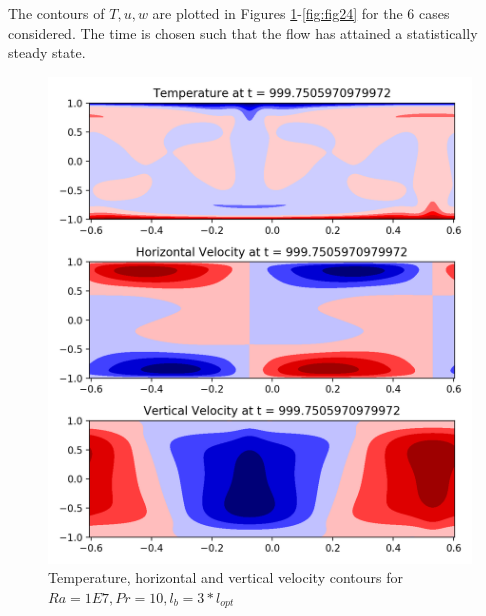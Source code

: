 \documentclass[12pt]{article}
\begin{document}
     The contours of $T,u,w$ are plotted in Figures \ref{fig:fig18}-\ref{fig:fig24} for the 6 cases considered. The time is chosen such that the flow has attained a statistically steady state.
     
     \begin{figure}[!htb]
     	\includegraphics[width=\linewidth]{contours_1E7_10_3.png}
     	\caption{Temperature, horizontal and vertical velocity contours for $Ra = 1E7, Pr =10, l_b = 3* l_{opt} $ }
     	\label{fig:fig18}
     \end{figure}
     
     \clearpage
     
\end{document}
